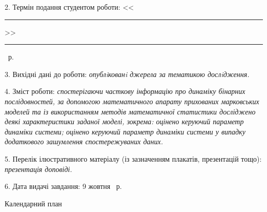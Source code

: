 2. Термін подання студентом роботи: <<\rule{0.5cm}{0.25pt}>> \rule{2.5cm}{0.25pt} \YearOfDefence~р.

3. Вихідні дані до роботи: \emph{опублiкованi джерела за тематикою дослiдження.}

4. Зміст роботи: \emph{спостерігаючи часткову інформацію про динаміку бінарних послідовностей, за допомогою математичного апарату прихованих марковських моделей та із використанням методів математичної статистики досліджено деякі характеристики заданої моделі, зокрема: оцінено керуючий параметр динаміки системи; оцінено керуючий параметр динаміки системи у випадку додаткового зашумлення спостережуваних даних.}

5. Перелік ілюстративного матеріалу (із зазначенням плакатів, презентацій 
тощо): \emph{презентація доповіді.}

6. Дата видачі завдання: 9 жовтня \YearOfBeginning~р.

\begin{center}
Календарний план
\end{center}

